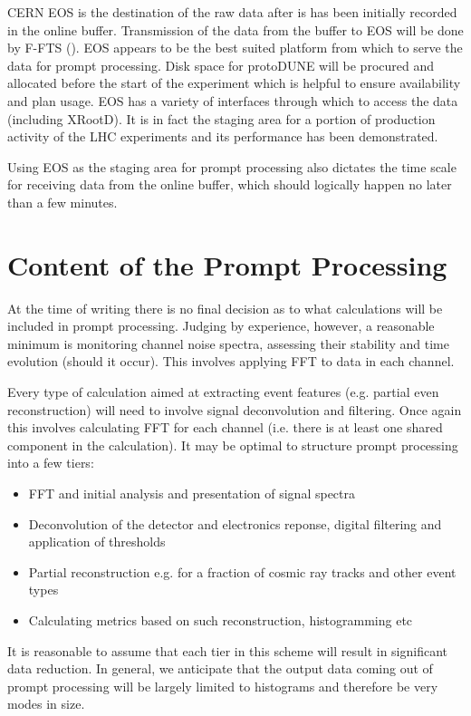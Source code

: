 \documentclass[pdftex,12pt,letter]{article}
\newcommand{\pd}{protoDUNE\xspace}
\begin{document}
CERN EOS is the destination of the raw data after is has been initially recorded in the online buffer. Transmission of the data from the buffer to EOS
will be done by F-FTS (\cite{docdb1212}). EOS appears to be the best suited platform from which to serve the data for prompt processing.
Disk space for \pd will be procured and allocated before the start of the experiment which is helpful to ensure availability and plan usage.
EOS has a variety of interfaces through which to access
the data (including XRootD). It is in fact the staging area
for a portion of production activity of the LHC experiments and its performance has been demonstrated.

Using EOS as the staging area for prompt processing also dictates the time scale for receiving data from the online buffer, which should
logically happen no later than a few minutes.

\section{Content of the Prompt Processing}
At the time of writing there is no final decision as to what calculations will be included in prompt processing.
Judging by experience, however, a reasonable minimum is monitoring channel noise spectra, assessing their stability and time evolution
(should it occur). This involves applying FFT to data in each channel.

Every type of calculation aimed at extracting event features (e.g. partial even reconstruction) will need to involve signal deconvolution
and filtering. Once again this involves calculating FFT for each channel (i.e. there is at least one shared component in the calculation).
It may be optimal to structure prompt processing into a few tiers:
\begin{itemize}
\item FFT and initial analysis and presentation of signal spectra
\item Deconvolution of the detector and electronics reponse, digital filtering and application of thresholds
\item Partial reconstruction e.g. for a fraction of cosmic ray tracks and other event types
\item Calculating metrics based on such reconstruction, histogramming etc
\end{itemize}

\noindent It is reasonable to assume that each tier in this scheme will result in significant data reduction. In general, we anticipate that
the output data coming out of prompt processing will be largely limited to histograms and therefore be very modes in size.
\end{document}
